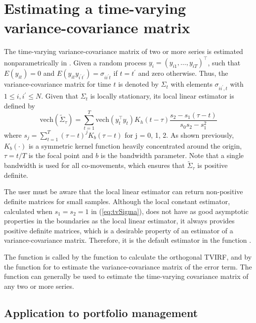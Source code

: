 \section{Estimating a time-varying variance-covariance matrix}\label{sec:tvCov}

The time-varying variance-covariance matrix of two or more series is estimated nonparametrically in . Given a random process $y_{i} = (y_{i1}, \ldots, y_{iT})^\top$, such that $E(y_{it})=0$ and $E( y_{it}y_{i^{\prime }t^\prime}) = \sigma_{ii^\prime t}$ if $t=t^\prime$ and zero otherwise. Thus, the variance-covariance matrix for time $t$ is denoted by $\Sigma_t$ with elements  $\sigma_{ii^\prime, t}$ with $1 \le i, i^\prime \le N$. Given that $\Sigma_t$ is locally stationary, its local linear estimator is defined by
\begin{equation}
\mbox{vech}(\tilde {\Sigma}_\tau )=\sum_{t=1}^{T}\mbox{vech}(y_t^\top y_t)K_{h}(t-\tau){\displaystyle%
\frac{s_{2}-s_{1}\left(\tau -t\right)}{s_{0}s_{2}-s_{1}^{2}}}
\label{eq:tvSigma}
\end{equation}
where $s_j = \sum_{t=1}^T (\tau -t)^j K_b(\tau - t) $ for j = 0, 1, 2. As shown previously, $K_{b}(\cdot)$ is a symmetric kernel function heavily concentrated around the origin, $\tau =t/T$ is the focal point and $b$ is the bandwidth parameter. Note that a single bandwidth is used for all co-movements, which
ensures that $\tilde \Sigma_\tau$ is positive definite. 

The user must be aware that the local linear estimator can return non-positive definite matrices for small samples. Although the local constant estimator, calculated when $s_1 = s_2 = 1$ in (\ref{eq:tvSigma}), does not have as good asymptotic properties in the boundaries as the local linear estimator, it always provides positive definite matrices, which is a desirable property of an estimator of a variance-covariance matrix. Therefore, it is the default estimator in the function . 

The function  is called by the function  to calculate the orthogonal TVIRF, and by the function  for  to estimate the variance-covariance matrix of the error term. The function  can generally be used to estimate the time-varying covariance matrix of any two or more series.


\subsection{Application to portfolio management}

